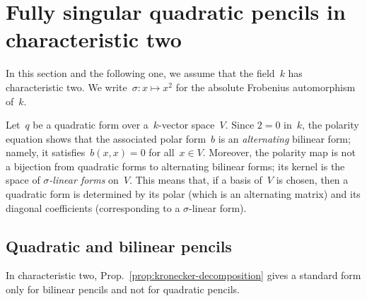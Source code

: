 \documentclass{lms}
\def\Ot{\widetilde{O}}
\begin{document}
% 
% 
% 
\section{Fully singular quadratic pencils in characteristic two}
\label{S:quad-sing}
In this section and the following one, we assume that the field~$k$ has
characteristic two.
We write~$σ: x ↦ x^2$ for the absolute Frobenius automorphism of~$k$.

Let~$q$ be a quadratic form over a~$k$-vector space~$V$. Since $2 = 0$
in~$k$, the polarity equation shows that the associated polar form~$b$ is
an \emph{alternating} bilinear form; namely, it satisfies~$b(x,x) = 0$
for all~$x ∈ V$. Moreover, the polarity map is not a bijection from
quadratic forms to alternating bilinear forms; its kernel is the space of
\emph{$σ$-linear forms} on~$V$. This means that, if a basis of~$V$ is
chosen, then a quadratic form is determined by its polar (which is an
alternating matrix) and its diagonal coefficients (corresponding to a
$σ$-linear form).


\subsection{Quadratic and bilinear pencils}

In characteristic two, Prop.~\ref{prop:kronecker-decomposition} gives a standard form only for
bilinear pencils and not for quadratic pencils.
\end{document}
